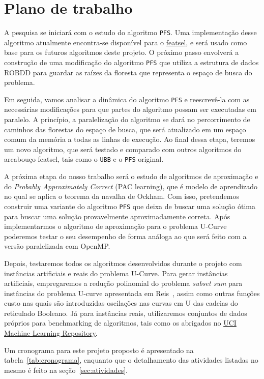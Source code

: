 \documentclass[12pt]{article}
\begin{document}
\section{Plano de trabalho}
A pesquisa se iniciará com o estudo do algoritmo {\tt PFS}. Uma 
implementação desse algoritmo atualmente encontra-se disponível para o  
\href{https://github.com/msreis/featsel}{featsel}, e será 
usado como base para os futuros algoritmos deste projeto. O próximo 
passo envolverá a construção de uma modificação do algoritmo {\tt PFS}
que utiliza a estrutura de dados ROBDD para guardar as raízes da 
floresta que representa o espaço de busca do problema.

Em seguida, vamos analisar a dinâmica do algoritmo {\tt PFS} e
reescrevê-la com as necessárias modificações para que partes do
algoritmo possam ser executadas em paralelo. A princípio, a
paralelização do algoritmo se dará no percorrimento de caminhos das
florestas do espaço de busca, que será atualizado em um espaço comum da
memória a todas as linhas de execução. Ao final dessa etapa, teremos um
novo algoritmo, que será testado e comparado com outros algoritmos do
arcabouço featsel, tais como o {\tt UBB} e o {\tt PFS} original.

A próxima etapa do nosso trabalho será o estudo de algoritmos de 
aproximação e do \textit{Probably Approximately
Correct} (PAC learning), que é modelo de aprendizado no qual se aplica o
teorema da navalha de Ockham. Com isso, pretendemos construir uma 
variante do algoritmo {\tt PFS} que deixa de buscar uma solução ótima 
para buscar uma solução provavelmente aproximadamente correta. Após 
implementarmos o algoritmo de aproximação para o problema U-Curve 
poderemos testar o seu desempenho de forma análoga ao que será feito 
com a versão paralelizada com OpenMP.

Depois, testaremos todos os algoritmos desenvolvidos durante o projeto
com instâncias artificiais e reais do problema U-Curve. Para gerar 
instâncias artificiais, empregaremos a redução polinomial do problema 
{\em subset sum} para instâncias do problema U-curve apresentada em 
Reis~\cite{msreis thesis}, assim como outras funções custo  nas quais
são introduzidas oscilações nas curvas em U das cadeias
do reticulado Booleano. Já para instâncias reais, utilizaremos conjuntos
de dados próprios para benchmarking de algoritmos, tais como os 
abrigados no \href{archive.ics.uci.edu/ml}{UCI Machine Learning 
Repository}.

Um cronograma para este projeto proposto é apresentado na 
tabela~\ref{tab:cronograma}, enquanto que o detalhamento das atividades
listadas no mesmo é feito na seção~\ref{sec:atividades}.
\end{document}
